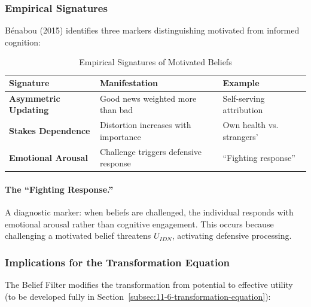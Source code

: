\subsubsection{Empirical Signatures}
\label{subsubsec:empirical-signatures}

Bénabou (2015) identifies three markers distinguishing motivated from informed 
cognition:

\begin{table}[htbp]
\centering
\caption{Empirical Signatures of Motivated Beliefs}
\label{tab:empirical-signatures}
\renewcommand{\arraystretch}{1.4}
\begin{tabular}{@{}lp{5cm}p{4cm}@{}}
\toprule
\textbf{Signature} & \textbf{Manifestation} & \textbf{Example} \\
\midrule
\textbf{Asymmetric Updating} & 
Good news weighted more than bad &
Self-serving attribution \\
\textbf{Stakes Dependence} & 
Distortion increases with importance &
Own health vs. strangers' \\
\textbf{Emotional Arousal} & 
Challenge triggers defensive response &
``Fighting response'' \\
\bottomrule
\end{tabular}
\end{table}

\paragraph{The ``Fighting Response.''}
A diagnostic marker: when beliefs are challenged, the individual responds 
with emotional arousal rather than cognitive engagement. This occurs because 
challenging a motivated belief threatens $U_{IDN}$, activating defensive 
processing.

\subsubsection{Implications for the Transformation Equation}
\label{subsubsec:transformation-implications}

The Belief Filter modifies the transformation from potential to effective 
utility (to be developed fully in Section~\ref{subsec:11-6-transformation-equation}):

